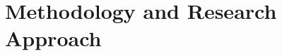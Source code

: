 \documentclass[12pt]{article}
\begin{document}

 



\section{Methodology and Research Approach}
\end{document}
